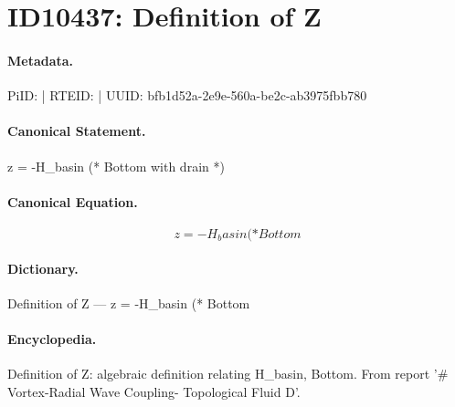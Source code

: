 \section*{ID10437: Definition of Z}
\paragraph{Metadata.}
PiID:  | RTEID:  | UUID: bfb1d52a-2e9e-560a-be2c-ab3975fbb780

\paragraph{Canonical Statement.}
z = -H\_basin (* Bottom with drain *)

\paragraph{Canonical Equation.}
\[
z = -H_basin (* Bottom
\]

\paragraph{Dictionary.}
Definition of Z — z = -H\_basin (* Bottom

\paragraph{Encyclopedia.}
Definition of Z: algebraic definition relating H\_basin, Bottom. From report '\# Vortex-Radial Wave Coupling- Topological Fluid D'.
